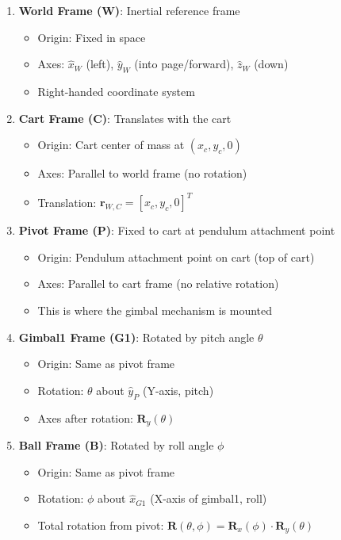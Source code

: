 \documentclass[12pt]{article}
\begin{document}
\begin{enumerate}
    \item \textbf{World Frame (W)}: Inertial reference frame
    \begin{itemize}
        \item Origin: Fixed in space
        \item Axes: $\hat{x}_W$ (left), $\hat{y}_W$ (into page/forward), $\hat{z}_W$ (down)
        \item Right-handed coordinate system
    \end{itemize}
    
    \item \textbf{Cart Frame (C)}: Translates with the cart
    \begin{itemize}
        \item Origin: Cart center of mass at $(x_c, y_c, 0)$
        \item Axes: Parallel to world frame (no rotation)
        \item Translation: $\mathbf{r}_{W,C} = [x_c, y_c, 0]^T$
    \end{itemize}
    
    \item \textbf{Pivot Frame (P)}: Fixed to cart at pendulum attachment point
    \begin{itemize}
        \item Origin: Pendulum attachment point on cart (top of cart)
        \item Axes: Parallel to cart frame (no relative rotation)
        \item This is where the gimbal mechanism is mounted
    \end{itemize}
    
    \item \textbf{Gimbal1 Frame (G1)}: Rotated by pitch angle $\theta$
    \begin{itemize}
        \item Origin: Same as pivot frame
        \item Rotation: $\theta$ about $\hat{y}_P$ (Y-axis, pitch)
        \item Axes after rotation: $\mathbf{R}_y(\theta)$
    \end{itemize}
    
    \item \textbf{Ball Frame (B)}: Rotated by roll angle $\phi$
    \begin{itemize}
        \item Origin: Same as pivot frame
        \item Rotation: $\phi$ about $\hat{x}_{G1}$ (X-axis of gimbal1, roll)
        \item Total rotation from pivot: $\mathbf{R}(\theta, \phi) = \mathbf{R}_x(\phi) \cdot \mathbf{R}_y(\theta)$
    \end{itemize}
\end{enumerate}
\end{document}
